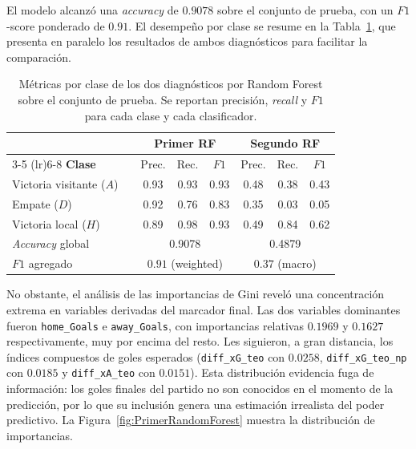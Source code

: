 El modelo alcanz\'o una \emph{accuracy} de $0{.}9078$ sobre el conjunto de prueba, con un $F1$-score ponderado de $0{.}91$. El desempe\~no por clase se resume en la 
Tabla~\ref{tab:rf_diagnostico}, que presenta en paralelo los resultados de ambos diagn\'osticos para facilitar la comparaci\'on.

\begin{table}[htbp]
	\centering
	\caption{M\'etricas por clase de los dos diagn\'osticos por 
		Random Forest sobre el conjunto de prueba. Se reportan precisi\'on, \emph{recall} y $F1$ para cada clase y cada clasificador.}
	\label{tab:rf_diagnostico}
	\small
	\begin{tabular}{llccc|ccc}
		\toprule
		& & \multicolumn{3}{c}{\textbf{Primer RF}} & 
		\multicolumn{3}{c}{\textbf{Segundo RF}} \\
		\cmidrule(lr){3-5} \cmidrule(lr){6-8}
		\textbf{Clase} & & Prec. & Rec. & $F1$ & Prec. & Rec. & $F1$ \\
		\midrule
		Victoria visitante ($A$) & & 0.93 & 0.93 & 0.93 & 0.48 & 0.38 & 0.43 \\
		Empate ($D$) & & 0.92 & 0.76 & 0.83 & 0.35 & 0.03 & 0.05 \\
		Victoria local ($H$) & & 0.89 & 0.98 & 0.93 & 0.49 & 0.84 & 0.62 \\
		\midrule
		\multicolumn{2}{l}{\textit{Accuracy} global} & 
		\multicolumn{3}{c}{0.9078} & \multicolumn{3}{c}{0.4879} \\
		\multicolumn{2}{l}{$F1$ agregado} & 
		\multicolumn{3}{c}{$0.91$ (weighted)} & 
		\multicolumn{3}{c}{$0.37$ (macro)} \\
		\bottomrule
	\end{tabular}
\end{table}

No obstante, el an\'alisis de las importancias de Gini revel\'o una concentraci\'on extrema en variables derivadas del marcador final. Las dos variables dominantes fueron \texttt{home\_Goals} e \texttt{away\_Goals}, con importancias relativas $0.1969$ y $0.1627$ respectivamente, muy por encima del resto. Les siguieron, a gran distancia, los \'indices compuestos de goles esperados (\texttt{diff\_xG\_teo} con $0.0258$, \texttt{diff\_xG\_teo\_np} con $0.0185$ y \texttt{diff\_xA\_teo} con $0.0151$). Esta distribuci\'on evidencia fuga de informaci\'on: los goles finales del partido no son conocidos en el momento de la predicci\'on, por lo que su inclusi\'on genera una estimaci\'on irrealista del poder predictivo. La Figura~\ref{fig:PrimerRandomForest} muestra la distribuci\'on de importancias.

